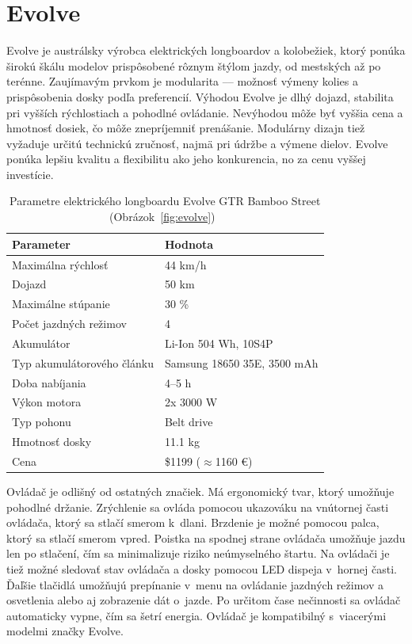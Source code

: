 \section{Evolve}
Evolve je austrálsky výrobca elektrických longboardov a kolobežiek, ktorý ponúka širokú škálu modelov prispôsobené rôznym štýlom jazdy, od mestských až po terénne.
Zaujímavým prvkom je modularita –-- možnosť výmeny kolies a prispôsobenia dosky podľa preferencií. 
Výhodou Evolve je dlhý dojazd, stabilita pri vyšších rýchlostiach a pohodlné ovládanie.
Nevýhodou môže byť vyššia cena a hmotnosť dosiek, čo môže znepríjemniť prenášanie. 
Modulárny dizajn tiež vyžaduje určitú technickú zručnosť, najmä pri údržbe a výmene dielov.
Evolve ponúka lepšiu kvalitu a flexibilitu ako jeho konkurencia, no za cenu vyššej investície.

\begin{table}[h]
    \centering
    \begin{tabular}{|l|l|}
        \hline
        \textbf{Parameter} & \textbf{Hodnota} \\ \hline
        Maximálna rýchlosť & 44 km/h \\ \hline
        Dojazd & 50 km \\ \hline
        Maximálne stúpanie & 30 \% \\ \hline
        Počet jazdných režimov & 4 \\ \hline
        Akumulátor & Li-Ion 504 Wh, 10S4P \\ \hline
        Typ akumulátorového článku & Samsung 18650 35E, 3500 mAh \\ \hline
        Doba nabíjania & 4--5 h \\ \hline
        Výkon motora & 2x 3000 W \\ \hline
        Typ pohonu & Belt drive \\ \hline
        Hmotnosť dosky & 11.1 kg \\ \hline
        Cena & \$1199 ($\approx$1160 €) \\ \hline
    \end{tabular}
    \caption{Parametre elektrického longboardu Evolve GTR Bamboo Street (Obrázok~\ref{fig:evolve})~\cite{Evolve}}\label{tab:evolve}
\end{table}

Ovládač je odlišný od ostatných značiek.
Má ergonomický  tvar, ktorý umožňuje pohodlné držanie.
Zrýchlenie sa ovláda pomocou ukazováku na vnútornej časti ovládača, ktorý sa stlačí smerom k~dlani.
Brzdenie je možné pomocou palca, ktorý sa stlačí smerom vpred.
Poistka na spodnej strane ovládača umožňuje jazdu len po stlačení, čím sa minimalizuje riziko neúmyselného štartu.
Na ovládači je tiež možné sledovať stav ovládača a dosky pomocou LED dispeja v~hornej časti.
Ďaľšie tlačidlá umožňujú prepínanie v~menu na ovládanie jazdných režimov a osvetlenia alebo aj zobrazenie dát o~jazde.
Po určitom čase nečinnosti sa ovládač automaticky vypne, čím sa šetrí energia.
Ovládač je kompatibilný s~viacerými modelmi značky Evolve.

